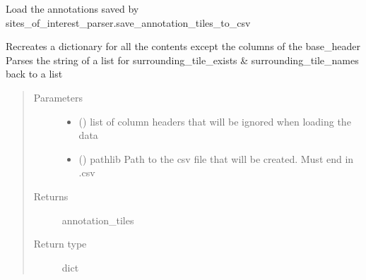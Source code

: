 \documentclass[letterpaper,10pt,english]{sphinxmanual}
\begin{document}
\begin{fulllineitems}
\begin{fulllineitems}
\end{fulllineitems}


\begin{fulllineitems}
\label{\detokenize{index:sites_of_interest_parser.MapsXmlParser.load_annotations_from_csv}}
Load the annotations saved by sites\_of\_interest\_parser.save\_annotation\_tiles\_to\_csv

Recreates a dictionary for all the contents except the columns of the base\_header
Parses the string of a list for surrounding\_tile\_exists \& surrounding\_tile\_names back to a list
\begin{quote}\begin{description}
\item[{Parameters}] \leavevmode\begin{itemize}
\item {} 
 () \textendash{} list of column headers that will be ignored when loading the data

\item {} 
 () \textendash{} pathlib Path to the csv file that will be created. Must end in .csv

\end{itemize}

\item[{Returns}] \leavevmode
annotation\_tiles

\item[{Return type}] \leavevmode
dict

\end{description}\end{quote}

\end{fulllineitems}



\end{fulllineitems}
\end{document}
